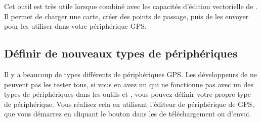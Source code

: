 Cet outil est très utile lorsque combiné avec les capacités d'édition vectorielle de \qg. Il permet de charger une carte, créer des points de passage, puis de les envoyer pour les utiliser dans votre périphérique GPS.

\subsection{\label{sec:Defining-new-device}Définir de nouveaux types de périphériques}

Il y a beaucoup de types différents de périphériques GPS.
Les développeurs de \qg ne peuvent pas les tester tous, si vous en avez un qui ne fonctionne pas avec un des types de périphériques dans les outils
 et , vous pouvez définir votre propre type de périphérique.
Vous réalisez cela en utilisant l'éditeur de périphérique de GPS, que vous démarrez en cliquant le bouton  dans les
de téléchargement ou d'envoi.

